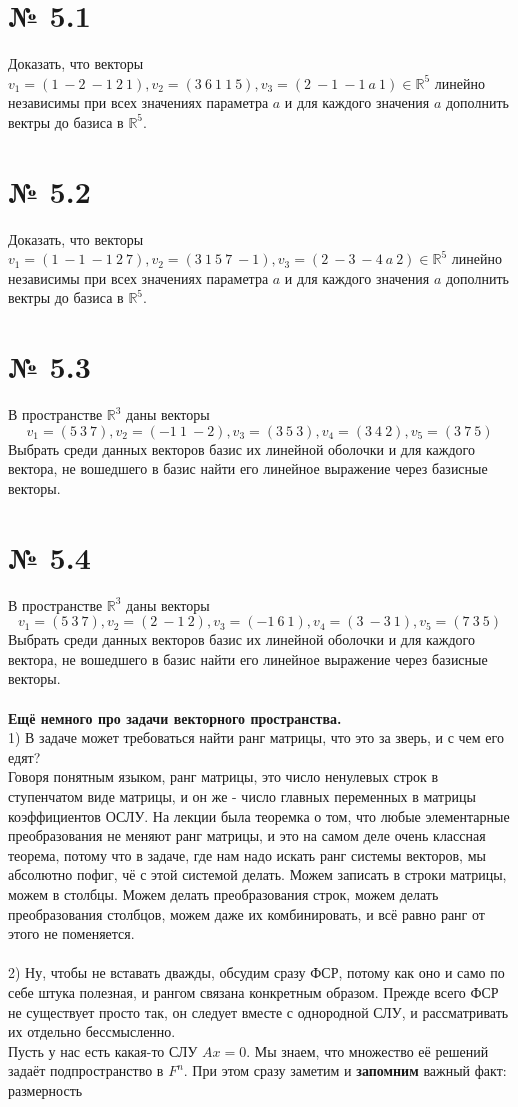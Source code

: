 \documentclass[a4paper,11pt]{report}
\begin{document}
\section{№ 5.1}
Доказать, что векторы $v_1 = (1\ -2\ -1\ 2\ 1), v_2 = (3\ 6\ 1\ 1\ 5), v_3 = (2\ -1\ -1\ a\ 1) \in \mathbb{R}^5$ линейно независимы
при всех значениях параметра $a$ и для каждого значения $a$ дополнить вектры до базиса в $\mathbb{R}^5$.
\section{№ 5.2}
Доказать, что векторы $v_1 = (1\ -1\ -1\ 2\ 7), v_2 = (3\ 1\ 5\ 7\ -1), v_3 = (2\ -3\ -4\ a\ 2) \in \mathbb{R}^5$ линейно независимы
при всех значениях параметра $a$ и для каждого значения $a$ дополнить вектры до базиса в $\mathbb{R}^5$.
\section{№ 5.3}
В пространстве $\mathbb{R}^3$ даны векторы
\[
v_1 = (5\ 3\ 7), v_2 = (-1\ 1\ -2), v_3 = (3\ 5\ 3), v_4 = (3\ 4\ 2), v_5 = (3\ 7\ 5)
\]
Выбрать среди данных векторов базис их линейной оболочки и для каждого вектора, не вошедшего в базис найти его
линейное выражение через базисные векторы.
\section{№ 5.4}
В пространстве $\mathbb{R}^3$ даны векторы
\[
v_1 = (5\ 3\ 7), v_2 = (2\ -1\ 2), v_3 = (-1\ 6\ 1), v_4 = (3\ -3\ 1), v_5 = (7\ 3\ 5)
\]
Выбрать среди данных векторов базис их линейной оболочки и для каждого вектора, не вошедшего в базис найти его
линейное выражение через базисные векторы.
\\
\\
\textbf{Ещё немного про задачи векторного пространства.}\\
1) В задаче может требоваться найти ранг матрицы, что это за зверь, и с чем его едят?\\
Говоря понятным языком, ранг матрицы, это число ненулевых строк в ступенчатом виде матрицы, и он же - число главных переменных
в матрицы коэффициентов ОСЛУ. На лекции была теоремка о том, что любые элементарные преобразования не меняют ранг матрицы,
и это на самом деле очень классная теорема, потому что в задаче, где нам надо искать ранг системы векторов, мы абсолютно пофиг,
чё с этой системой делать. Можем записать в строки матрицы, можем в столбцы. Можем делать преобразования строк, можем делать
преобразования столбцов, можем даже их комбинировать, и всё равно ранг от этого не поменяется.\\
\\
2) Ну, чтобы не вставать дважды, обсудим сразу ФСР, потому как оно и само по себе штука полезная, и рангом связана конкретным образом.
Прежде всего ФСР не существует просто так, он следует вместе с однородной СЛУ, и рассматривать их отдельно бессмысленно.\\
Пусть у нас есть какая-то СЛУ $Ax = 0$. Мы знаем, что множество её решений задаёт подпространство в $F^n$. При этом
сразу заметим и \textbf{запомним} важный факт: размерность 
\end{document}
